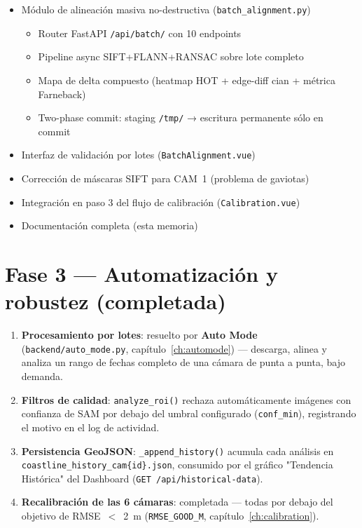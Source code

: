 \begin{itemize}[leftmargin=1.5em]
  \item[$\bullet$] Módulo de alineación masiva no-destructiva (\texttt{batch\_alignment.py})
    \begin{itemize}
      \item Router FastAPI \texttt{/api/batch/} con 10 endpoints
      \item Pipeline async SIFT+FLANN+RANSAC sobre lote completo
      \item Mapa de delta compuesto (heatmap HOT + edge-diff cian + métrica Farneback)
      \item Two-phase commit: staging \texttt{/tmp/} → escritura permanente sólo en commit
    \end{itemize}
  \item[$\bullet$] Interfaz de validación por lotes (\texttt{BatchAlignment.vue})
  \item[$\bullet$] Corrección de máscaras SIFT para CAM~1 (problema de gaviotas)
  \item[$\bullet$] Integración en paso 3 del flujo de calibración (\texttt{Calibration.vue})
  \item[$\bullet$] Documentación completa (esta memoria)
\end{itemize}

\section{Fase 3 — Automatización y robustez (completada)}

\begin{enumerate}[leftmargin=1.5em]
  \item \textbf{Procesamiento por lotes}: resuelto por \textbf{Auto Mode}
        (\texttt{backend/auto\_mode.py}, capítulo~\ref{ch:automode}) — descarga, alinea y analiza
        un rango de fechas completo de una cámara de punta a punta, bajo demanda.
  \item \textbf{Filtros de calidad}: \texttt{analyze\_roi()} rechaza automáticamente imágenes con
        confianza de SAM por debajo del umbral configurado (\texttt{conf\_min}), registrando el
        motivo en el log de actividad.
  \item \textbf{Persistencia GeoJSON}: \texttt{\_append\_history()} acumula cada análisis en
        \texttt{coastline\_history\_cam\{id\}.json}, consumido por el gráfico "Tendencia
        Histórica" del Dashboard (\texttt{GET /api/historical-data}).
  \item \textbf{Recalibración de las 6 cámaras}: completada — todas por debajo del objetivo de
        RMSE~$<$~2~m (\texttt{RMSE\_GOOD\_M}, capítulo~\ref{ch:calibration}).
\end{enumerate}

